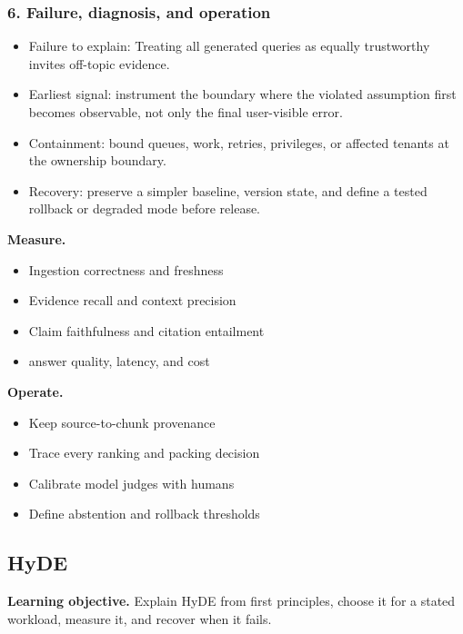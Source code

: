\subsubsection*{6. Failure, diagnosis, and operation}
\begin{itemize}
\item Failure to explain: Treating all generated queries as equally trustworthy invites off-topic evidence.
\item Earliest signal: instrument the boundary where the violated assumption first becomes observable, not only the final user-visible error.
\item Containment: bound queues, work, retries, privileges, or affected tenants at the ownership boundary.
\item Recovery: preserve a simpler baseline, version state, and define a tested rollback or degraded mode before release.
\end{itemize}
\textbf{Measure.}\begin{itemize}
\item Ingestion correctness and freshness
\item Evidence recall and context precision
\item Claim faithfulness and citation entailment
\item answer quality, latency, and cost
\end{itemize}
\textbf{Operate.}\begin{itemize}
\item Keep source-to-chunk provenance
\item Trace every ranking and packing decision
\item Calibrate model judges with humans
\item Define abstention and rollback thresholds
\end{itemize}
\subsection{HyDE}
\textbf{Learning objective.} Explain HyDE from first principles, choose it for a stated workload, measure it, and recover when it fails.
